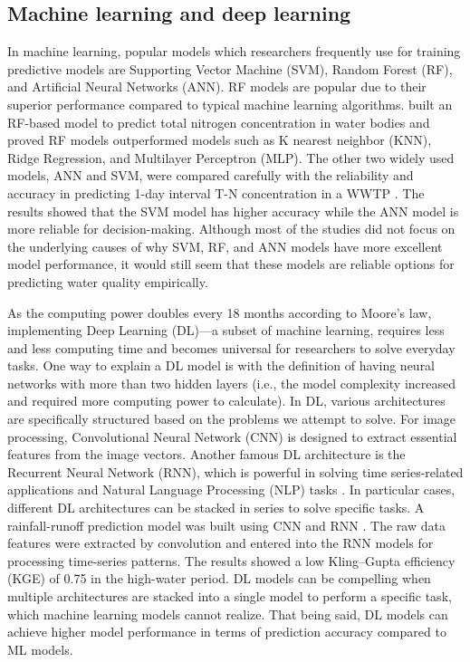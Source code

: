 \subsection{Machine learning and deep learning}
In machine learning, popular models which researchers frequently use for training predictive models are Supporting Vector Machine (SVM), Random Forest (RF), and Artificial Neural Networks (ANN). RF models are popular due to their superior performance compared to typical machine learning algorithms.  \citet{xuAlternativeLaboratoryTesting2021} built an RF-based model to predict total nitrogen concentration in water bodies and proved RF models outperformed models such as K nearest neighbor (KNN), Ridge Regression,  and Multilayer Perceptron (MLP). The other two widely used models, ANN and SVM, were compared carefully with the reliability and accuracy in predicting 1-day interval T-N concentration in a WWTP \citep{guoPredictionEffluentConcentration2015}. The results showed that the SVM model has higher accuracy while the ANN model is more reliable for decision-making. Although most of the studies did not focus on the underlying causes of why SVM, RF, and ANN models have more excellent model performance, it would still seem that these models are reliable options for predicting water quality empirically.

As the computing power doubles every 18 months according to Moore's law, implementing Deep Learning (DL)---a subset of machine learning, requires less and less computing time and becomes universal for researchers to solve everyday tasks. One way to explain a DL model is with the definition of having neural networks with more than two hidden layers (i.e., the model complexity increased and required more computing power to calculate). In DL, various architectures are specifically structured based on the problems we attempt to solve. For image processing, Convolutional Neural Network (CNN) is designed to extract essential features from the image vectors. Another famous DL architecture is the Recurrent Neural Network (RNN), which is powerful in solving time series-related applications and Natural Language Processing (NLP) tasks \citep{liERNNDesignOptimization2018}. In particular cases, different DL architectures can be stacked in series to solve specific tasks. A rainfall-runoff prediction model was built using CNN and RNN \citep{liPredictionFlowBased2022}. The raw data features were extracted by convolution and entered into the RNN models for processing time-series patterns. The results showed a low Kling–Gupta efficiency (KGE) of 0.75 in the high-water period. DL models can be compelling when multiple architectures are stacked into a single model to perform a specific task, which machine learning models cannot realize. That being said, DL models can achieve higher model performance in terms of prediction accuracy compared to ML models. 


